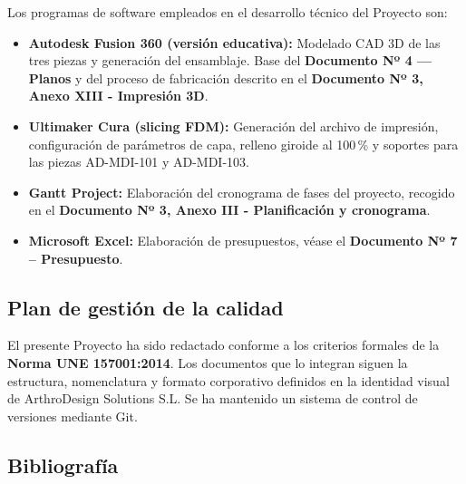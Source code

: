 \documentclass[11pt,a4paper]{article}
\begin{document}
Los programas de software empleados en el desarrollo técnico del Proyecto son:

\begin{itemize}
    \item \textbf{Autodesk Fusion 360 (versión educativa):} Modelado CAD 3D de las tres piezas y generación del ensamblaje. Base del \textbf{Documento Nº 4 — Planos} y del proceso de fabricación descrito en el \textbf{Documento Nº 3, Anexo XIII - Impresión 3D}.
    \item \textbf{Ultimaker Cura (slicing FDM):} Generación del archivo de impresión, configuración de parámetros de capa, relleno giroide al 100\,\% y soportes para las piezas AD-MDI-101 y AD-MDI-103.
    \item \textbf{Gantt Project:} Elaboración del cronograma de fases del proyecto, recogido en el \textbf{Documento Nº 3, Anexo III - Planificación y cronograma}.
    \item \textbf{Microsoft Excel:} Elaboración de presupuestos, véase el \textbf{Documento Nº 7 -- Presupuesto}.
\end{itemize}

\subsection{Plan de gestión de la calidad}

El presente Proyecto ha sido redactado conforme a los criterios formales de la \textbf{Norma UNE 157001:2014}. Los documentos que lo integran siguen la estructura, nomenclatura y formato corporativo definidos en la identidad visual de ArthroDesign Solutions S.L. Se ha mantenido un sistema de control de versiones mediante Git.

\subsection{Bibliografía}
\end{document}
